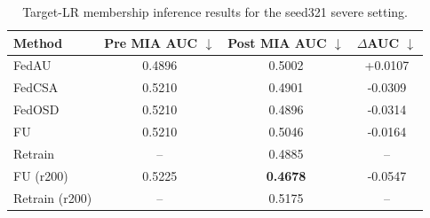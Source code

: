 \begin{table}[t]
\centering
\caption{Target-LR membership inference results for the seed321 severe setting.}
\label{tab:targetlr_mia_seed321}
\begin{tabular}{lccc}
\toprule
Method & Pre MIA AUC $\downarrow$ & Post MIA AUC $\downarrow$ & $\Delta$AUC $\downarrow$ \\
\midrule
FedAU & 0.4896 & 0.5002 & +0.0107 \\
FedCSA & 0.5210 & 0.4901 & -0.0309 \\
FedOSD & 0.5210 & 0.4896 & -0.0314 \\
FU & 0.5210 & 0.5046 & -0.0164 \\
Retrain & -- & 0.4885 & -- \\
FU (r200) & 0.5225 & \textbf{0.4678} & -0.0547 \\
Retrain (r200) & -- & 0.5175 & -- \\
\bottomrule
\end{tabular}
\end{table}